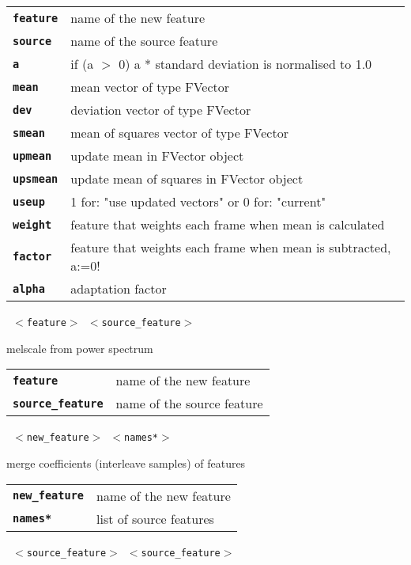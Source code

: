 \begin{description}
\begin{description}
      \begin{tabular}{ll}
 \texttt{\textbf{feature}} &  name of the new feature \\
 \texttt{\textbf{source}} &   name of the source feature \\
 \texttt{\textbf{a}} &         if (a $>$ 0) a * standard deviation is normalised to 1.0  \\
 \texttt{\textbf{mean}} &      mean vector of type FVector \\
 \texttt{\textbf{dev}} &       deviation vector of type FVector \\
 \texttt{\textbf{smean}} &     mean of squares vector of type FVector \\
 \texttt{\textbf{upmean}} &    update mean in FVector object  \\
 \texttt{\textbf{upsmean}} &   update mean of squares  in FVector object  \\
 \texttt{\textbf{useup}} &     1 for: "use updated vectors" or 0 for: "current"  \\
 \texttt{\textbf{weight}} &    feature that weights each frame when mean is calculated \\
 \texttt{\textbf{factor}} &    feature that weights each frame when mean is subtracted, a:=0! \\
 \texttt{\textbf{alpha}} &     adaptation factor  \\
      \end{tabular}
       \texttt{ $<$feature$>$ $<$source\_feature$>$} \

        melscale from power spectrum

      \begin{tabular}{ll}
 \texttt{\textbf{feature}} &         name of the new feature \\
 \texttt{\textbf{source\_feature}} &  name of the source feature \\
      \end{tabular}
       \texttt{ $<$new\_feature$>$ $<$names*$>$} \

        merge coefficients (interleave samples) of features

      \begin{tabular}{ll}
 \texttt{\textbf{new\_feature}} &  name of the new feature \\
 \texttt{\textbf{names*}} & list of source features \\
      \end{tabular}
       \texttt{ $<$source\_feature$>$ $<$source\_feature$>$  } \


\end{description}
\end{description}
